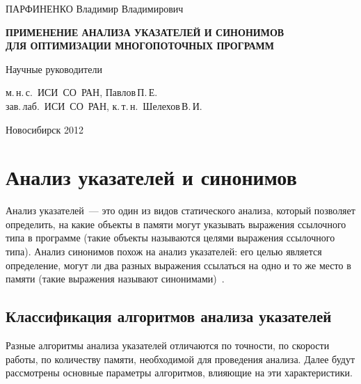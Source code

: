 \documentclass[14pt,titlepage,draft]{extarticle}
\let\oldsection\section
\renewcommand{\section}{\newpage\oldsection}
\begin{document}
\begin{center}
{      \vspace{0.2cm}

      ПАРФИНЕНКО Владимир Владимирович

      \vspace{1.5cm}

      \textbf{
        ПРИМЕНЕНИЕ АНАЛИЗА УКАЗАТЕЛЕЙ И СИНОНИМОВ\\
        ДЛЯ ОПТИМИЗАЦИИ МНОГОПОТОЧНЫХ ПРОГРАММ
      }

      \vspace{2.5cm}

      \begin{flushright}

        Научные руководители

        м.\,н.\,с.~ИСИ~СО~РАН, Павлов\,П.\,Е.\\
        зав.\,лаб.~ИСИ~СО~РАН, к.\,т.\,н.~Шелехов\,В.\,И.

      \end{flushright}

      \vspace {4cm}

      Новосибирск 2012
    }
  \end{center}

  \listoftodos

  \tableofcontents

  \section{Анализ указателей и синонимов}

    Анализ указателей~--- это один из видов статического анализа, который
    позволяет определить, на какие объекты в памяти могут указывать выражения
    ссылочного типа в программе (такие объекты называются целями выражения
    ссылочного типа). Анализ синонимов похож на анализ указателей: его целью
    является определение, могут ли два разных выражения ссылаться на одно и
    то же место в памяти (такие выражения называют синонимами)~\cite{andersen}.

    \subsection{Классификация алгоритмов анализа указателей}
    \label{section:analysis_classification}

      Разные алгоритмы анализа указателей отличаются по точности, по скорости
      работы, по количеству памяти, необходимой для проведения анализа.
      Далее будут рассмотрены основные параметры алгоритмов, влияющие на эти
      характеристики.
\end{document}
